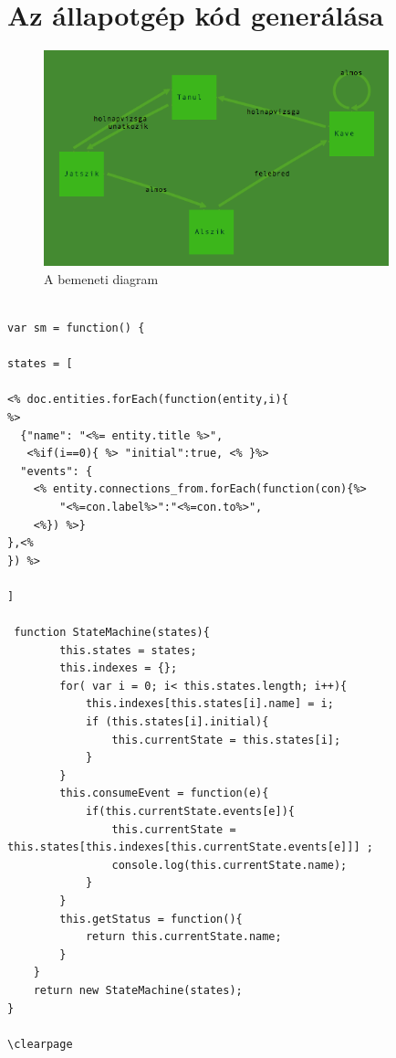 \clearpage\section{Az állapotgép kód generálása}

\begin{figure}[!ht]
\centering
\includegraphics[width=100mm, keepaspectratio]{figures/tanulo.png}
\caption{A bemeneti diagram} 
\end{figure}


\begin{lstlisting}[caption=Az állapotgép kódgeneráló UnderscoreJS template-je]  

var sm = function() {

states = [

<% doc.entities.forEach(function(entity,i){
%>
  {"name": "<%= entity.title %>", 
   <%if(i==0){ %> "initial":true, <% }%>
  "events": {
    <% entity.connections_from.forEach(function(con){%>
        "<%=con.label%>":"<%=con.to%>",
    <%}) %>}
},<%
}) %>

]

 function StateMachine(states){
        this.states = states;
        this.indexes = {}; 
        for( var i = 0; i< this.states.length; i++){
            this.indexes[this.states[i].name] = i;
            if (this.states[i].initial){
                this.currentState = this.states[i];
            }
        }
        this.consumeEvent = function(e){
            if(this.currentState.events[e]){
                this.currentState = this.states[this.indexes[this.currentState.events[e]]] ;
                console.log(this.currentState.name);
            }
        }
        this.getStatus = function(){
            return this.currentState.name;
        }
    }
    return new StateMachine(states);
}

\clearpage

\end{lstlisting}



